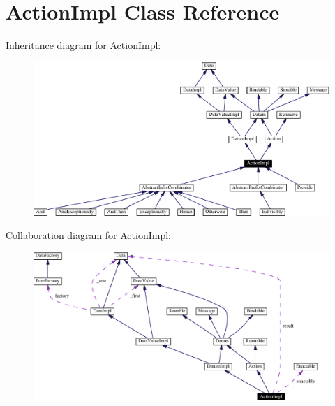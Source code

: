 \hypertarget{classActionImpl}{
\section{Action\-Impl  Class Reference}
\label{classActionImpl}
}
Inheritance diagram for Action\-Impl:\begin{figure}[H]
\begin{center}
\leavevmode
\includegraphics[width=321pt]{classActionImpl__inherit__graph}
\end{center}
\end{figure}
Collaboration diagram for Action\-Impl:\begin{figure}[H]
\begin{center}
\leavevmode
\includegraphics[width=323pt]{classActionImpl__coll__graph}
\end{center}
\end{figure}

